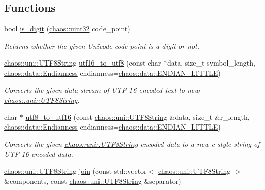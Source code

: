 \subsection*{Functions}
\begin{DoxyCompactItemize}
\item 
bool \hyperlink{namespacechaos_1_1uni_a25a7549a0378aeac227c881220c23640}{is\-\_\-digit} (\hyperlink{namespacechaos_a8641b3ae4551f0b35570d4f9f4ec22d9}{chaos\-::uint32} code\-\_\-point)
\begin{DoxyCompactList}\small\item\em Returns whether the given Unicode code point is a digit or not. \end{DoxyCompactList}\item 
\hyperlink{classchaos_1_1uni_1_1_u_t_f8_string}{chaos\-::uni\-::\-U\-T\-F8\-String} \hyperlink{namespacechaos_1_1uni_a5cf55ebf5dfcdef4398023f15b673e1c}{utf16\-\_\-to\-\_\-utf8} (const char $\ast$data, size\-\_\-t symbol\-\_\-length, \hyperlink{namespacechaos_1_1data_adb2657d50c0b84cdc1153001031bbf3f}{chaos\-::data\-::\-Endianness} endianness=\hyperlink{namespacechaos_1_1data_adb2657d50c0b84cdc1153001031bbf3fa7fc5455bb6147c278dfa4a84e255c66d}{chaos\-::data\-::\-E\-N\-D\-I\-A\-N\-\_\-\-L\-I\-T\-T\-L\-E})
\begin{DoxyCompactList}\small\item\em Converts the given data stream of U\-T\-F-\/16 encoded text to new \hyperlink{classchaos_1_1uni_1_1_u_t_f8_string}{chaos\-::uni\-::\-U\-T\-F8\-String}. \end{DoxyCompactList}\item 
char $\ast$ \hyperlink{namespacechaos_1_1uni_ae9ad4c8b653b2202e908fec0dce094e7}{utf8\-\_\-to\-\_\-utf16} (const \hyperlink{classchaos_1_1uni_1_1_u_t_f8_string}{chaos\-::uni\-::\-U\-T\-F8\-String} \&data, size\-\_\-t \&r\-\_\-length, \hyperlink{namespacechaos_1_1data_adb2657d50c0b84cdc1153001031bbf3f}{chaos\-::data\-::\-Endianness} endianness=\hyperlink{namespacechaos_1_1data_adb2657d50c0b84cdc1153001031bbf3fa7fc5455bb6147c278dfa4a84e255c66d}{chaos\-::data\-::\-E\-N\-D\-I\-A\-N\-\_\-\-L\-I\-T\-T\-L\-E})
\begin{DoxyCompactList}\small\item\em Converts the given \hyperlink{classchaos_1_1uni_1_1_u_t_f8_string}{chaos\-::uni\-::\-U\-T\-F8\-String} encoded data to a new c style string of U\-T\-F-\/16 encoded data. \end{DoxyCompactList}\item 
\hyperlink{classchaos_1_1uni_1_1_u_t_f8_string}{chaos\-::uni\-::\-U\-T\-F8\-String} \hyperlink{namespacechaos_1_1uni_ad2a77983423c8b10e2b18cae6f35d329}{join} (const std\-::vector$<$ \hyperlink{classchaos_1_1uni_1_1_u_t_f8_string}{chaos\-::uni\-::\-U\-T\-F8\-String} $>$ \&components, const \hyperlink{classchaos_1_1uni_1_1_u_t_f8_string}{chaos\-::uni\-::\-U\-T\-F8\-String} \&separator)

\end{DoxyCompactItemize}
